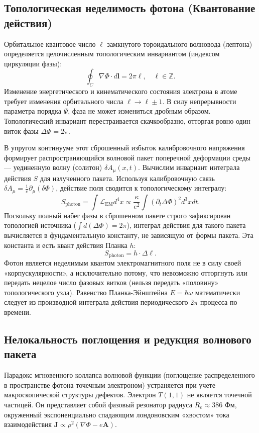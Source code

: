 \documentclass[12pt,a4paper]{article}
\begin{document}
\subsection{Топологическая неделимость фотона (Квантование действия)}
Орбитальное квантовое число $\ell$ замкнутого тороидального волновода (лептона) определяется целочисленным топологическим инвариантом (индексом циркуляции фазы):
\begin{equation}
	\oint_{C} \nabla \Phi \cdot d\mathbf{l} = 2\pi \ell, \quad \ell \in \mathbb{Z}.
\end{equation}
Изменение энергетического и кинематического состояния электрона в атоме требует изменения орбитального числа $\ell \to \ell \pm 1$. В силу непрерывности параметра порядка $\Psi$, фаза не может измениться дробным образом. Топологический инвариант перестраивается скачкообразно, отторгая ровно один виток фазы $\Delta \Phi = 2\pi$.

В упругом континууме этот сброшенный избыток калибровочного напряжения формирует распространяющийся волновой пакет поперечной деформации среды — уединенную волну (солитон) $\delta A_\mu(x,t)$. 
Вычислим инвариант интеграла действия $S$ для излученного пакета. Используя калибровочную связь $\delta A_\mu = \frac{1}{e} \partial_\mu (\delta \Phi)$, действие поля сводится к топологическому интегралу:
\begin{equation}
	S_{\text{photon}} = \int \mathcal{L}_{\text{EM}} d^4x \propto \frac{\kappa}{e^2} \int (\partial_t \Delta \Phi)^2 d^3x dt.
\end{equation}
Поскольку полный набег фазы в сброшенном пакете строго зафиксирован топологией источника ($\int d(\Delta \Phi) = 2\pi$), интеграл действия для такого пакета вычисляется в фундаментальную константу, не зависящую от формы пакета. Эта константа и есть квант действия Планка $h$:
\begin{equation}
	S_{\text{photon}} = h \cdot \Delta \ell.
\end{equation}
Фотон является неделимым квантом электромагнитного поля не в силу своей «корпускулярности», а исключительно потому, что невозможно отторгнуть или передать нецелое число фазовых витков (нельзя передать «половину» топологического узла). Равенство Планка-Эйнштейна $E = \hbar \omega$ математически следует из производной интеграла действия периодического $2\pi$-процесса по времени.

\subsection{Нелокальность поглощения и редукция волнового пакета}
Парадокс мгновенного коллапса волновой функции (поглощение распределенного в пространстве фотона точечным электроном) устраняется при учете макроскопической структуры дефектов.
Электрон $T(1,1)$ не является точечной частицей. Он представляет собой фазовый резонатор радиуса $R_e \approx 386$ Фм, окруженный экспоненциально спадающим лондоновским «хвостом» тока взаимодействия $\mathbf{J} \propto \rho^2 (\nabla \Phi - e \mathbf{A})$.
\end{document}
